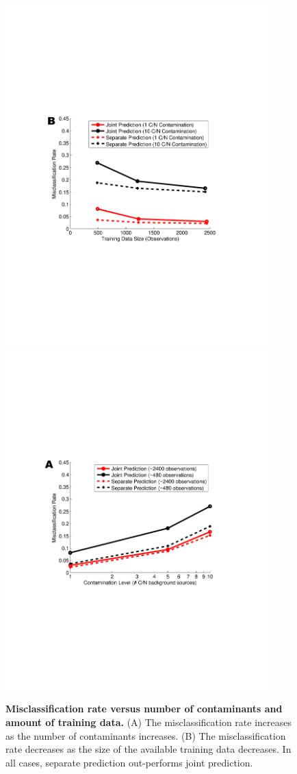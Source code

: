 \documentclass[12pt]{article}
\begin{document}
\clearpage
\begin{figure}[!ht]
\centerline{\includegraphics[width=4in]{Figures/VaryingNoiseNEW.pdf}\includegraphics[width=4in]{Figures/VaryingDataNEW.pdf}}
\caption{\label{fig:misclassification}\textbf{Misclassification rate versus number of contaminants and amount of training data.} (A) The misclassification rate increases as the number of contaminants increases. (B) The misclassification rate decreases as the size of the available training data decreases. In all cases, separate prediction out-performs joint prediction.}
\end{figure}
\end{document}
